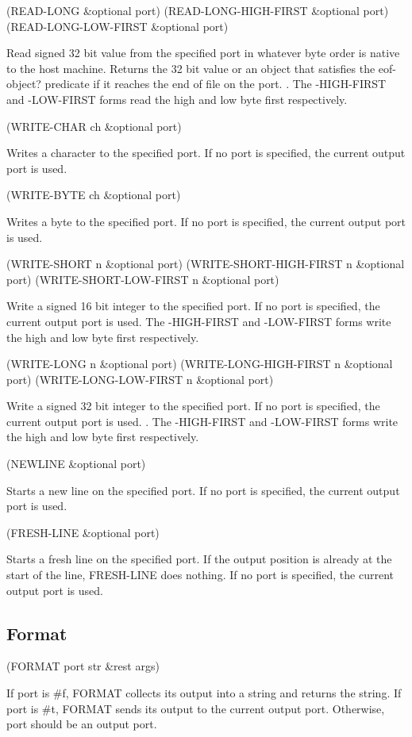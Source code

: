 \documentclass[11pt]{article}
\begin{document}
(READ-LONG \&optional port)
(READ-LONG-HIGH-FIRST \&optional port)
(READ-LONG-LOW-FIRST \&optional port)

Read signed 32 bit value from the specified port in whatever byte order
is native to the host machine.  Returns the 32 bit value or an object
that satisfies the eof-object? predicate if it reaches the end of file
on the port. .  The -HIGH-FIRST and -LOW-FIRST forms read the high and
low byte first respectively.

(WRITE-CHAR ch \&optional port)

Writes a character to the specified port. If no port is specified, the
current output port is used.

(WRITE-BYTE ch \&optional port)

Writes a byte to the specified port. If no port is specified, the
current output port is used.

(WRITE-SHORT n \&optional port)
(WRITE-SHORT-HIGH-FIRST n \&optional port)
(WRITE-SHORT-LOW-FIRST n \&optional port)

Write a signed 16 bit integer to the specified port.  If no port is
specified, the current output port is used.  The -HIGH-FIRST and
-LOW-FIRST forms write the high and low byte first respectively.

(WRITE-LONG n \&optional port)
(WRITE-LONG-HIGH-FIRST n \&optional port)
(WRITE-LONG-LOW-FIRST n \&optional port)

Write a signed 32 bit integer to the specified port.  If no port is
specified, the current output port is used. .  The -HIGH-FIRST and
-LOW-FIRST forms write the high and low byte first respectively.


(NEWLINE \&optional port)

Starts a new line on the specified port. If no port is specified, the
current output port is used.

(FRESH-LINE \&optional port)

Starts a fresh line on the specified port.  If the output position is
already at the start of the line, FRESH-LINE does nothing.  If no port
is specified, the current output port is used.
\subsection{Format}
\label{sec-1-37}

(FORMAT port str \&rest args)

If port is \#f, FORMAT collects its output into a string and returns the
string.  If port is \#t, FORMAT sends its output to the current output
port.  Otherwise, port should be an output port.
\end{document}
